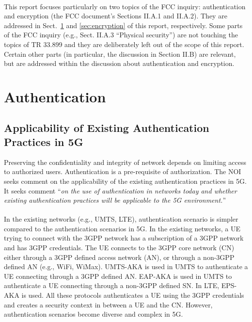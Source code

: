 \documentclass[12pt]{llncs}
\newcommand\ques[1]{``\emph{#1}''}
\begin{document}
\paragraph{}
This report focuses particularly on two topics of the FCC inquiry: authentication and encryption (the FCC document's Sections II.A.1 and II.A.2). They are addressed in Sect.~\ref{sec:authentication} and \ref{sec:encryption} of this report, respectively. Some parts of the FCC inquiry (e.g., Sect. II.A.3 ``Physical security'') are not touching the topics of TR 33.899 and they are deliberately left out of the scope of this report. Certain other parts (in particular, the discussion in Section II.B) are relevant, but are addressed within the discussion about authentication and encryption.

\section{Authentication}
\label{sec:authentication}
\subsection{Applicability of Existing Authentication Practices in 5G}
Preserving the confidentiality and integrity of network depends on limiting access to authorized users. Authentication is a pre-requisite of authorization. The NOI seeks comment on the applicability of the existing authentication practices in 5G. It seeks comment \ques{on the use of authentication in networks today and whether existing authentication practices will be applicable to the 5G environment.}
\paragraph{}
In the existing networks (e.g., UMTS, LTE), authentication scenario is simpler compared to the authentication scenarios in 5G. In the existing networks, a UE trying to connect with the 3GPP network has a subscription of a 3GPP network and has 3GPP credentials. The UE connects to the 3GPP core network (CN) either through a 3GPP defined access network (AN), or through a non-3GPP defined AN (e.g., WiFi, WiMax). UMTS-AKA is used in UMTS to authenticate a UE connecting through a 3GPP defined AN. EAP-AKA is used in UMTS to authenticate a UE connecting through a non-3GPP defined SN. In LTE, EPS-AKA is used. All these protocols authenticates a UE using the 3GPP credentials and creates a security context in between a UE and the CN. However, authentication scenarios become diverse and complex in 5G.
\end{document}
